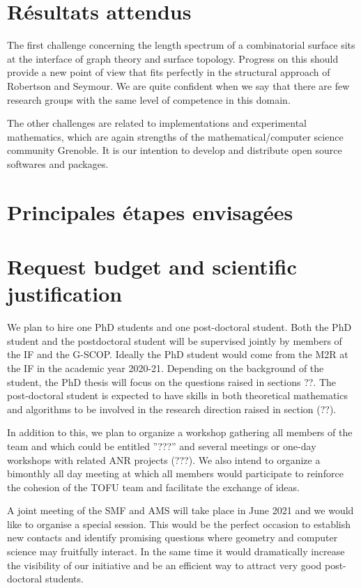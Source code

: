 \documentclass[14pt,fleqn]{article}
\begin{document}
\section{Résultats attendus}

The first challenge concerning the length spectrum of a combinatorial surface sits at the interface of graph theory and surface topology. Progress on this should provide a new point of view that fits perfectly in the structural approach of Robertson and Seymour. We are quite confident when we say  that there are few research groups with the same level of competence  in this domain.

The other challenges are related to implementations and experimental mathematics, 
which are again strengths of the 
mathematical/computer science community Grenoble. 
It is our intention to develop and distribute open source softwares and packages.

\section{Principales étapes envisagées}


\section{ Request budget and scientific justification}

We plan to hire one PhD students and one post-doctoral student. 
Both the PhD student
and the postdoctoral student
will be supervised jointly 
by members of the IF and the G-SCOP.
Ideally the PhD student would
come from the M2R at the IF 
in the academic year 2020-21.
Depending on the background of the student, the PhD thesis will focus on the
questions raised in sections ??.
The post-doctoral student is expected to have skills in both
theoretical mathematics 
and algorithms
to be involved in the research direction raised in section (??).

In addition to this, we plan to organize a workshop gathering all members of the
team and which could be entitled ”???” and several meetings
or one-day workshops with related ANR projects (???).
We also intend to organize 
a bimonthly all day meeting 
at which all members would participate
to reinforce the cohesion of the TOFU team
and facilitate the exchange of ideas.

A joint meeting of the SMF and AMS
will take place in June 2021
and we would like to organise a
special session.
This would be the perfect occasion to establish new contacts and identify promising questions where
geometry and computer science may fruitfully interact. In the same time it would dramatically
increase the visibility of our initiative and be an efficient way to attract very good post-doctoral
students.
\end{document}
